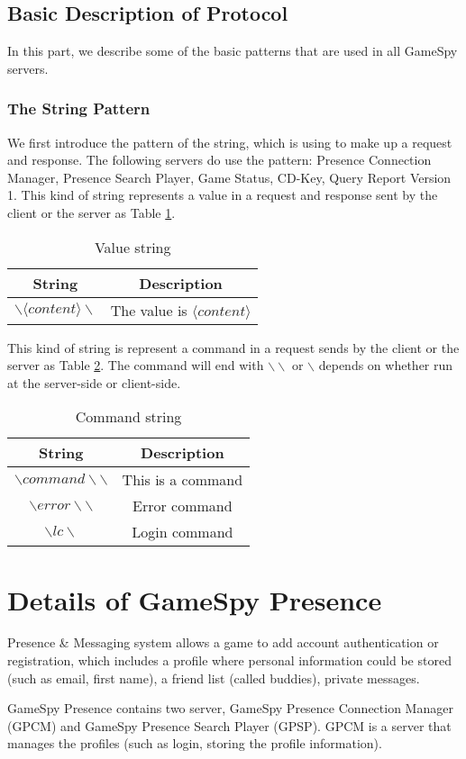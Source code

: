 \documentclass[oneside,titlepage,a4paper]{Definition/retrospy} %
\begin{document}
\section{Basic Description of Protocol}
In this part, we describe some of the basic patterns that are used in all GameSpy servers.

\subsection{The String Pattern}
We first introduce the pattern of the string, which is using to make up a request and response.
The following servers do use the pattern: Presence Connection Manager, Presence Search Player, Game Status, CD-Key, Query Report Version 1.
This kind of string represents a value in a request and response sent by the client or the server as Table \ref{Value string}.

\begin{table}[H]
	\centering
	\begin{tabular}{|c|c|}
		\hline 
		\textbf{String}&\textbf{Description}  \\ 
		\hline 
		$ \backslash \langle content \rangle \backslash $& The value is $ \langle content \rangle $  \\ 
		\hline 
	\end{tabular} 
	\caption{Value string}
	\label{Value string}
\end{table}

This kind of string is represent a command in a request sends by the client or the server as Table \ref{Command string}.
The command will end with $ \backslash \backslash $ or $ \backslash $ depends on whether run at the server-side or client-side.


\begin{table}[H]
	\centering
	\begin{tabular}{|c|c|}
		\hline 
		\textbf{String}&\textbf{Description}  \\ 
		\hline 
		$ \backslash command \backslash\backslash $& This is a command \\ 		
		\hline 
		$ \backslash error \backslash \backslash $ & Error command \\
		\hline
		$\backslash lc \backslash$& Login command\\
		\hline
	\end{tabular} 
	\caption{Command string}
	\label{Command string}
\end{table}


\chapter{Details of GameSpy Presence}
\par Presence \& Messaging system allows a game to add account authentication or registration, which includes a profile where personal information could be stored (such as email, first name), a friend list (called buddies), private messages.
\par GameSpy Presence contains two server, GameSpy Presence Connection Manager (GPCM) and GameSpy Presence Search Player (GPSP).
GPCM is a server that manages the profiles (such as login, storing the profile information).
\end{document}

